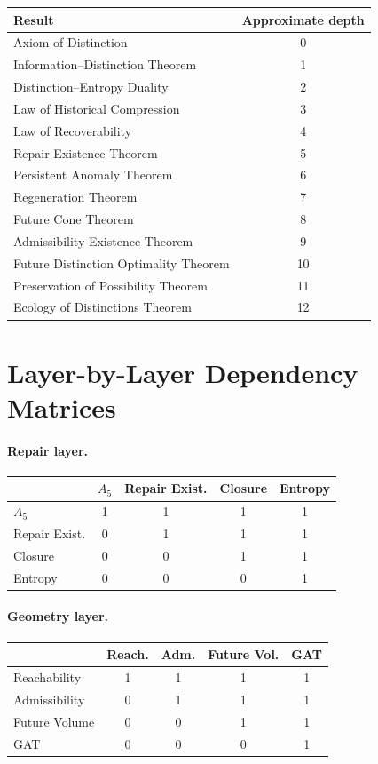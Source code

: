 \documentclass[12pt,twoside,openright]{book}
\begin{document}
\begin{center}
\begin{tabular}{lc}
\toprule
Result & Approximate depth \\
\midrule
Axiom of Distinction & 0 \\
Information--Distinction Theorem & 1 \\
Distinction--Entropy Duality & 2 \\
Law of Historical Compression & 3 \\
Law of Recoverability & 4 \\
Repair Existence Theorem & 5 \\
Persistent Anomaly Theorem & 6 \\
Regeneration Theorem & 7 \\
Future Cone Theorem & 8 \\
Admissibility Existence Theorem & 9 \\
Future Distinction Optimality Theorem & 10 \\
Preservation of Possibility Theorem & 11 \\
Ecology of Distinctions Theorem & 12 \\
\bottomrule
\end{tabular}
\end{center}

\section{Layer-by-Layer Dependency Matrices}

\paragraph{Repair layer.}
\begin{center}
\begin{tabular}{lcccc}
\toprule
& $A_5$ & Repair Exist. & Closure & Entropy \\
\midrule
$A_5$ & 1&1&1&1 \\
Repair Exist. & 0&1&1&1 \\
Closure & 0&0&1&1 \\
Entropy & 0&0&0&1 \\
\bottomrule
\end{tabular}
\end{center}

\paragraph{Geometry layer.}
\begin{center}
\begin{tabular}{lcccc}
\toprule
& Reach. & Adm. & Future Vol. & GAT \\
\midrule
Reachability & 1&1&1&1 \\
Admissibility & 0&1&1&1 \\
Future Volume & 0&0&1&1 \\
GAT & 0&0&0&1 \\
\bottomrule
\end{tabular}
\end{center}
\end{document}
